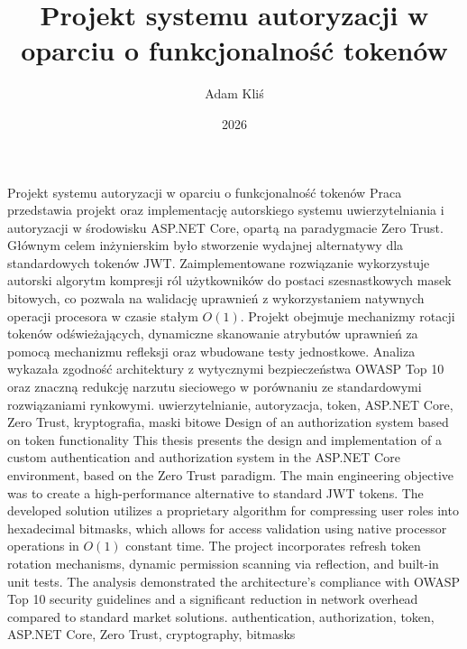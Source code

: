 \documentclass{SGGW-thesis}
\author{Adam Kliś}
\title{Projekt systemu autoryzacji w oparciu o funkcjonalność tokenów}
\date{2026}
\begin{document}
\maketitle
\statementpage
\abstractpage
{Projekt systemu autoryzacji w oparciu o funkcjonalność tokenów}
{Praca przedstawia projekt oraz implementację autorskiego systemu uwierzytelniania i autoryzacji w środowisku ASP.NET Core, opartą na paradygmacie Zero Trust. Głównym celem inżynierskim było stworzenie wydajnej alternatywy dla standardowych tokenów JWT. Zaimplementowane rozwiązanie wykorzystuje autorski algorytm kompresji ról użytkowników do postaci szesnastkowych masek bitowych, co pozwala na walidację uprawnień z wykorzystaniem natywnych operacji procesora w czasie stałym $O(1)$. Projekt obejmuje mechanizmy rotacji tokenów odświeżających, dynamiczne skanowanie atrybutów uprawnień za pomocą mechanizmu refleksji oraz wbudowane testy jednostkowe. Analiza wykazała zgodność architektury z wytycznymi bezpieczeństwa OWASP Top 10 oraz znaczną redukcję narzutu sieciowego w porównaniu ze standardowymi rozwiązaniami rynkowymi.}
{uwierzytelnianie, autoryzacja, token, ASP.NET Core, Zero Trust, kryptografia, maski bitowe}
{Design of an authorization system based on token functionality}
{This thesis presents the design and implementation of a custom authentication and authorization system in the ASP.NET Core environment, based on the Zero Trust paradigm. The main engineering objective was to create a high-performance alternative to standard JWT tokens. The developed solution utilizes a proprietary algorithm for compressing user roles into hexadecimal bitmasks, which allows for access validation using native processor operations in $O(1)$ constant time. The project incorporates refresh token rotation mechanisms, dynamic permission scanning via reflection, and built-in unit tests. The analysis demonstrated the architecture's compliance with OWASP Top 10 security guidelines and a significant reduction in network overhead compared to standard market solutions.}
{authentication, authorization, token, ASP.NET Core, Zero Trust, cryptography, bitmasks}
\end{document}
